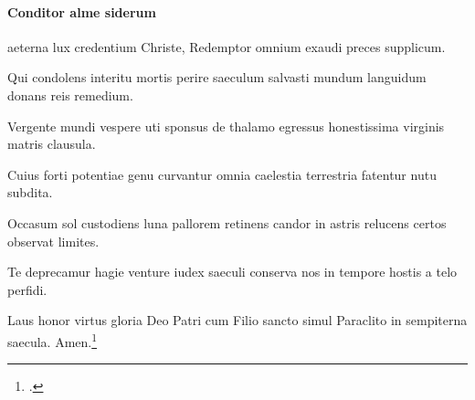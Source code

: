 \paragraph{Conditor alme siderum}
aeterna lux credentium
Christe, Redemptor omnium
exaudi preces supplicum.

Qui condolens interitu
mortis perire saeculum
salvasti mundum languidum
donans reis remedium.

Vergente mundi vespere
uti sponsus de thalamo
egressus honestissima
virginis matris clausula.

Cuius forti potentiae
genu curvantur omnia
caelestia terrestria
fatentur nutu subdita.

Occasum sol custodiens
luna pallorem retinens
candor in astris relucens
certos observat limites.

Te deprecamur hagie
venture iudex saeculi
conserva nos in tempore
hostis a telo perfidi.

Laus honor virtus gloria
Deo Patri cum Filio
sancto simul Paraclito
in sempiterna saecula.
Amen.\footcite[67r]{bp1502}
